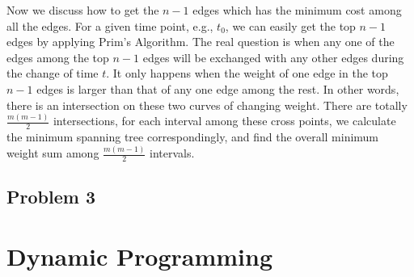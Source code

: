 \documentclass[paper=a4, fontsize=11pt]{scrartcl} %
\numberwithin{equation}{section} %
\numberwithin{figure}{section} %
\numberwithin{table}{section} %
\begin{document}
Now we discuss how to get the $n-1$ edges which has the minimum cost among all the edges. For a given time point, e.g., $t_0$, we can easily get the top $n-1$ edges by applying Prim's Algorithm. The real question is when any one of the edges among the top $n-1$ edges will be exchanged with any other edges during the change of time $t$. It only happens when the weight of one edge in the top $n-1$ edges is larger than that of any one edge among the rest. In other words, there is an intersection on these two curves of changing weight. There are totally $\frac{m(m-1)}{2}$ intersections, for each interval among these cross points, we calculate the minimum spanning tree correspondingly, and find the overall minimum weight sum among $\frac{m(m-1)}{2}$ intervals. 


\subsection*{Problem 3}



\section*{Dynamic Programming}
\end{document}

